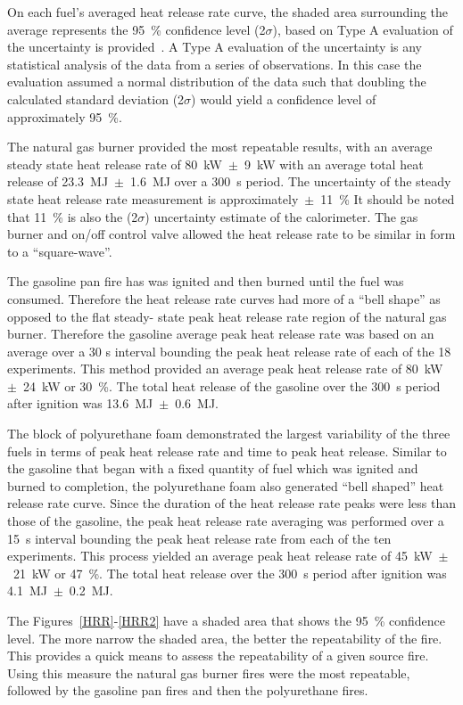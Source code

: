 \documentclass[twoside]{uocthesis}
\begin{document}
{On each fuel’s averaged heat release rate curve, the shaded area surrounding the average represents the 95~\% confidence level (2$\sigma$), based on Type A evaluation of the uncertainty is provided~\cite{Taylor:1994}.  A Type A evaluation of the uncertainty is any statistical analysis of the data from a series of observations.  In this case the evaluation assumed a normal distribution of the data such that doubling the calculated standard deviation (2$\sigma$) would yield a confidence level of approximately 95~\%.

The natural gas burner provided the most repeatable results, with an average steady state heat release rate of 80~kW~$\pm$~9~kW with an average total heat release of 23.3~MJ~$\pm$~1.6~MJ over a 300~s period. The uncertainty of the steady state heat release rate measurement is approximately~$\pm$~11~\% It should be noted that 11~\% is also the (2$\sigma$) uncertainty estimate of the calorimeter. The gas burner and on/off control valve allowed the heat release rate to be similar in form to a ``square-wave''. 

The gasoline pan fire has was ignited and then burned until the fuel was consumed.  Therefore the heat release rate curves had more of a ``bell shape''  as opposed to the flat steady- state peak heat release rate region of the natural gas burner.  Therefore the  gasoline average peak heat release rate was based on an average over a 30 s interval bounding the peak heat release rate of each of the 18 experiments.  This method provided an average peak heat release rate of 80~kW~$\pm$~24~kW or 30~\%.  The total heat release of the gasoline over the 300~s period after ignition was 13.6~MJ~$\pm$~0.6~MJ.  

The block of polyurethane foam demonstrated the largest variability of the three fuels in terms of peak heat release rate and time to peak heat release. Similar to the gasoline that began with a fixed quantity of fuel which was ignited and burned to completion, the polyurethane foam also generated ``bell shaped'' heat release rate curve.  Since the duration of the heat release rate peaks were less than those of the gasoline, the peak heat release rate averaging was performed over a 15~s interval bounding the peak heat release rate from each of the ten experiments.  This process yielded an average peak heat release rate of 45~kW~$\pm$~21~kW or 47~\%.  The total heat release over the 300~s period after ignition was 4.1~MJ~$\pm$~0.2~MJ. 

The Figures~\ref{HRR}-\ref{HRR2} have a shaded area that shows the 95~\% confidence level.  The more narrow the shaded area, the better the repeatability of the fire.  This provides a quick means to assess the repeatability of a given source fire.  Using this measure the natural gas burner fires were the most repeatable, followed by the gasoline pan fires and then the polyurethane fires.       


}
\end{document}
